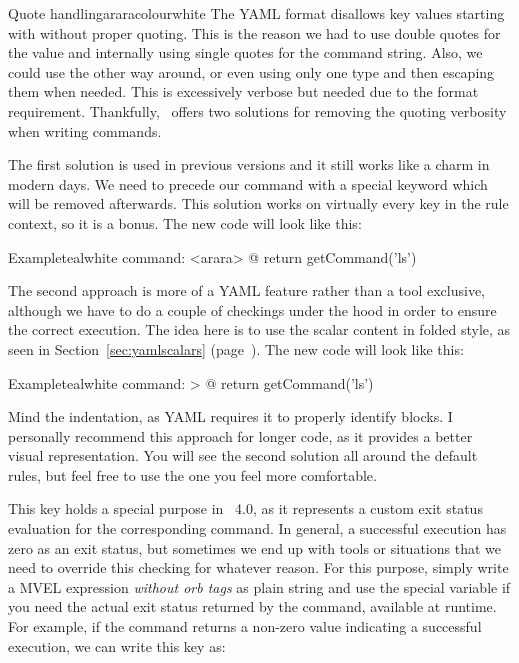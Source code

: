 \begin{description}
\begin{description}
\begin{messagebox}{Quote handling}{araracolour}{\icinfo}{white}
\setlength{\parskip}{1em}
The YAML format disallows key values starting with  without proper quoting. This is the reason we had to use double quotes for the value and internally using single quotes for the command string. Also, we could use the other way around, or even using only one type and then escaping them when needed. This is excessively verbose but needed due to the format requirement. Thankfully, \arara\ offers two solutions for removing the quoting verbosity when writing commands.

The first solution is used in previous versions and it still works like a charm in modern days. We need to precede our command with a special keyword  which will be removed afterwards. This solution works on virtually every key in the rule context, so it is a bonus. The new code will look like this:

\begin{codebox}{Example}{teal}{\icnote}{white}
command: <arara> @{ return getCommand('ls') }
\end{codebox}

The second approach is more of a YAML feature rather than a tool exclusive, although we have to do a couple of checkings under the hood in order to ensure the correct execution. The idea here is to use the scalar content in folded style, as seen in Section~\ref{sec:yamlscalars} (page~\pageref{sec:yamlscalars}). The new code will look like this:

\begin{codebox}{Example}{teal}{\icnote}{white}
command: >
  @{
    return getCommand('ls')
  }
\end{codebox}

Mind the indentation, as YAML requires it to properly identify blocks. I personally recommend this approach for longer code, as it provides a better visual representation. You will see the second solution all around the default rules, but feel free to use the one you feel more comfortable.
\end{messagebox}

\item[\describecontext{O}{commands}{exit}] This key holds a special purpose in \arara\ 4.0, as it represents a custom exit status evaluation for the corresponding command. In general, a successful execution has zero as an exit status, but sometimes we end up with tools or situations that we need to override this checking for whatever reason. For this purpose, simply write a MVEL expression \emph{without orb tags} as plain string and use the special variable  if you need the actual exit status returned by the command, available at runtime. For example, if the command returns a non-zero value indicating a successful execution, we can write this key as:


\end{description}
\end{description}
